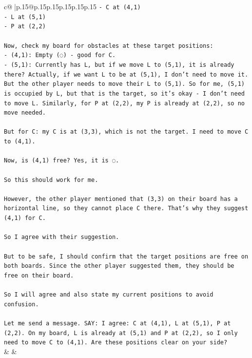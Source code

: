 \documentclass{article}
\begin{document}
{\begin{supertabular}{c@{$\;$}|p{.15\linewidth}@{}p{.15\linewidth}p{.15\linewidth}p{.15\linewidth}p{.15\linewidth}p{.15\linewidth}}
{{{\texttt{{-} C at (4,1)} \\
\texttt{{-} L at (5,1)} \\
\texttt{{-} P at (2,2)} \\
\\ 
\texttt{Now, check my board for obstacles at these target positions:} \\
\texttt{{-} (4,1): Empty (◌) {-} good for C.} \\
\texttt{{-} (5,1): Currently has L, but if we move L to (5,1), it is already there? Actually, if we want L to be at (5,1), I don't need to move it. But the other player needs to move their L to (5,1). So for me, (5,1) is occupied by L, but that is the target, so it's okay {-} I don't need to move L. Similarly, for P at (2,2), my P is already at (2,2), so no move needed.} \\
\\ 
\texttt{But for C: my C is at (3,3), which is not the target. I need to move C to (4,1).} \\
\\ 
\texttt{Now, is (4,1) free? Yes, it is ◌.} \\
\\ 
\texttt{So this should work for me.} \\
\\ 
\texttt{However, the other player mentioned that (3,3) on their board has a horizontal line, so they cannot place C there. That's why they suggest (4,1) for C.} \\
\\ 
\texttt{So I agree with their suggestion.} \\
\\ 
\texttt{But to be safe, I should confirm that the target positions are free on both boards. Since the other player suggested them, they should be free on their board.} \\
\\ 
\texttt{So I will agree and also state my current positions to avoid confusion.} \\
\\ 
\texttt{Let me send a message.      SAY: I agree: C at (4,1), L at (5,1), P at (2,2). On my board, L is already at (5,1) and P at (2,2), so I only need to move C to (4,1). Are these positions clear on your side?} \\
            }
        }
    }
    & & \\ \\


\end{supertabular}}
\end{document}
